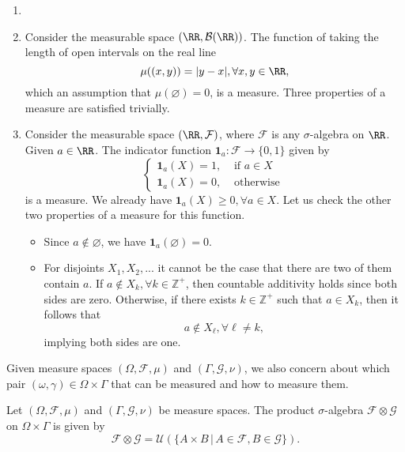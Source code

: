 \begin{example}
    \begin{enumerate}
        \item []
        \item Consider the measurable space $(\RR, \mathcal{B}(\RR))  $. The function of taking the length of open intervals on the real line
              $$\mu((x,y))=|y-x|,\forall x,y\in\RR,$$
              which an assumption that $\mu(\varnothing)=0$, is a measure. Three properties of a measure are satisfied trivially.
        \item Consider the measurable space $(\RR, \mathcal{F})$, where $\mathcal{F}$ is any $\sigma$-algebra on $\RR$. Given $a\in\RR$. The indicator function $\mathbf{1}_a: \mathcal{F}\to\{0,1\}$ given by
              $$\begin{cases}
                      \mathbf{1}_a(X)=1, & \text{ if } a\in X \\
                      \mathbf{1}_a(X)=0, & \text{ otherwise }
                  \end{cases}$$
              is a measure. We already have $\mathbf{1}_a(X)\ge0, \forall a\in X$. Let us check the other two properties of a measure for this function.
              \begin{itemize}
                  \item Since $a\notin\varnothing$, we have $\mathbf{1}_a(\varnothing)=0$.
                  \item For disjoints $X_1,X_2,...$ it cannot be the case that there are two of them contain $a$. If $a\notin X_k,\forall k\in\mathbb{Z}^+$, then countable additivity holds since both sides are zero. Otherwise, if there exists $k\in \mathbb{Z}^+$ such that $a\in X_k$, then it follows that $$a\notin X_\ell, \forall \ell\ne k,$$ implying both sides are one.
              \end{itemize}
    \end{enumerate}
\end{example}

Given measure spaces $(\Omega,\mathcal{F},\mu)$ and $(\Gamma,\mathcal{G},\nu)$, we also concern about which pair $(\omega,\gamma)\in\Omega\times\Gamma$ that can be measured and how to measure them.

\begin{definition}
    Let $(\Omega,\mathcal{F},\mu)$ and $(\Gamma,\mathcal{G},\nu)$ be measure spaces. The product $\sigma$-algebra $\mathcal{F}\otimes\mathcal{G}$ on $\Omega\times\Gamma$ is given by
    $$\mathcal{F}\otimes\mathcal{G}=\mathcal{U}(\{A\times B\,|\, A\in\mathcal{F},B\in\mathcal{G}\}).$$
\end{definition}

